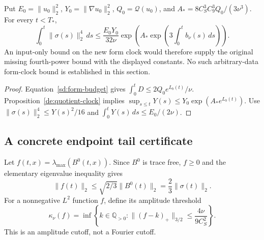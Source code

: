 \begin{corollary}
\label{sd:missing-bound-consumer}
Put $E_0=\|u_0\|_2^2$, $Y_0=\|\nabla u_0\|_2^2$,
$Q_0=\mathcal Q(u_0)$, and
$A_* =8C_S^3C_9^3Q_0/(3\nu^3)$. For every $t<T_*$,
\begin{equation}\label{sd:conditional-missing-bound}
 \int_0^t\|\sigma(s)\|_2^4\,ds
 \le\frac{E_0Y_0}{32\nu}
       \exp\!\left(A_*\exp\!\left(3\int_0^t b_\nu(s)\,ds\right)\right).
\end{equation}
An input-only bound on the new form clock would therefore supply the
original missing fourth-power bound with the displayed constants.
No such arbitrary-data form-clock bound is established in this section.
\end{corollary}
\begin{proof}
Equation~\eqref{sd:form-budget} gives
$\int_0^tD\le2Q_0e^{L_b(t)}/\nu$.
Proposition~\ref{de:quotient-clock} implies
$\sup_{s\le t}Y(s)\le Y_0\exp(A_*e^{L_b(t)})$.
Use $\|\sigma(s)\|_2^4\le Y(s)^2/16$ and
$\int_0^tY(s)\,ds\le E_0/(2\nu)$.
\end{proof}

\subsection{A concrete endpoint tail certificate}

Let $f(t,x)=\lambda_{\max}(B^0(t,x))$. Since $B^0$ is trace free,
$f\ge0$ and the elementary eigenvalue inequality gives
\begin{equation}\label{sd:positive-potential}
 \|f(t)\|_2\le\sqrt{2/3}\|B^0(t)\|_2
 =\frac23\|\sigma(t)\|_2.
\end{equation}
For a nonnegative $L^2$ function $f$, define its amplitude threshold
\begin{equation}\label{sd:threshold-definition}
 \kappa_\nu(f)=\inf\left\{k\in\mathbb Q_{>0}:
 \|(f-k)_+\|_{3/2}\le\frac{4\nu}{9C_S^2}\right\}.
\end{equation}
This is an amplitude cutoff, not a Fourier cutoff.

